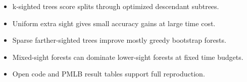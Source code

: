 \begin{itemize}
\item k-sighted trees score splits through optimized descendant subtrees.
\item Uniform extra sight gives small accuracy gains at large time cost.
\item Sparse farther-sighted trees improve mostly greedy bootstrap forests.
\item Mixed-sight forests can dominate lower-sight forests at fixed time budgets.
\item Open code and PMLB result tables support full reproduction.
\end{itemize}
